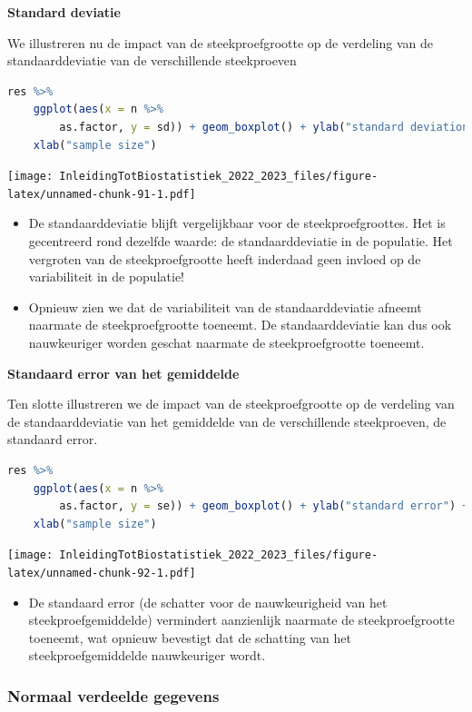 \documentclass[
  12pt,dutch,coursenotes]{book}
\providecommand{\tightlist}{%
  \setlength{\itemsep}{0pt}\setlength{\parskip}{0pt}}
\begin{document}
\textbf{Standard deviatie}

We illustreren nu de impact van de steekproefgrootte op de verdeling van de standaarddeviatie van de verschillende steekproeven

\begin{lstlisting}[language=R]
res %>%
    ggplot(aes(x = n %>%
        as.factor, y = sd)) + geom_boxplot() + ylab("standard deviation") +
    xlab("sample size")
\end{lstlisting}

\texttt{[image: InleidingTotBiostatistiek\_2022\_2023\_files/figure-latex/unnamed-chunk-91-1.pdf]}

\begin{itemize}
\item
  De standaarddeviatie blijft vergelijkbaar voor de steekproefgroottes.
  Het is gecentreerd rond dezelfde waarde: de standaarddeviatie in de populatie. Het vergroten van de steekproefgrootte heeft inderdaad geen invloed op de variabiliteit in de populatie!
\item
  Opnieuw zien we dat de variabiliteit van de standaarddeviatie afneemt naarmate de steekproefgrootte toeneemt. De standaarddeviatie kan dus ook nauwkeuriger worden geschat naarmate de steekproefgrootte toeneemt.
\end{itemize}

\textbf{Standaard error van het gemiddelde}

Ten slotte illustreren we de impact van de steekproefgrootte op de verdeling van de standaarddeviatie van het gemiddelde van de verschillende steekproeven, de standaard error.

\begin{lstlisting}[language=R]
res %>%
    ggplot(aes(x = n %>%
        as.factor, y = se)) + geom_boxplot() + ylab("standard error") +
    xlab("sample size")
\end{lstlisting}

\texttt{[image: InleidingTotBiostatistiek\_2022\_2023\_files/figure-latex/unnamed-chunk-92-1.pdf]}

\begin{itemize}
\tightlist
\item
  De standaard error (de schatter voor de nauwkeurigheid van het steekproefgemiddelde) vermindert aanzienlijk naarmate de steekproefgrootte toeneemt, wat opnieuw bevestigt dat de schatting van het steekproefgemiddelde nauwkeuriger wordt.
\end{itemize}

\hypertarget{normaal-verdeelde-gegevens}{%
\subsubsection{Normaal verdeelde gegevens}\label{normaal-verdeelde-gegevens}}
\end{document}
